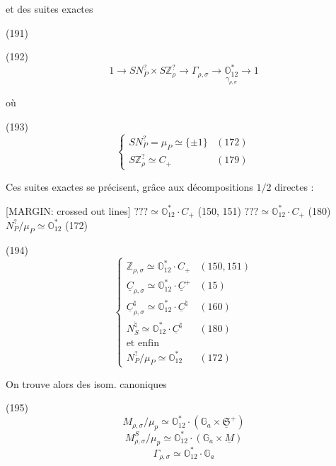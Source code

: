 et des suites exactes

(191)

(192)
$$1 \to S N^?_P \times S\mathbb{Z}^?_\rho \to \Gamma_{\rho,\sigma} \to \underset{\gamma_{\rho,\sigma}}{\mathbb{O}_{12}^*} \to 1$$

où

(193)
$$ \begin{cases} S N^?_P = \mu_P \simeq \{\pm 1\} & (172) \\ S\mathbb{Z}^?_\rho \simeq C_+ & (179) \end{cases} $$

Ces suites exactes se précisent, grâce
aux décompositions $1/2$ directes :

[MARGIN: crossed out lines]
$??? \simeq \mathbb{O}_{12}^* \cdot C_+$ (150, 151)
$??? \simeq \mathbb{O}_{12}^* \cdot C_+$ (180)
$N^?_P / \mu_P \simeq \mathbb{O}_{12}^*$ (172)

(194)
$$ \begin{cases} \mathbb{Z}_{\rho,\sigma} \simeq \mathbb{O}_{12}^* \cdot C_+ & (150, 151) \\ \underline{C}_{\rho,\sigma} \simeq \mathbb{O}_{12}^* \cdot \underline{C}^+ & (15) \\ \underline{C}^\natural_{\rho,\sigma} \simeq \mathbb{O}_{12}^* \cdot \underline{C}^\natural & (160) \\ N^\natural_S \simeq \mathbb{O}_{12}^* \cdot \underline{C}^\natural & (180) \\ \text{et enfin} \\ N^?_P / \mu_P \simeq \mathbb{O}_{12}^* & (172) \end{cases} $$

\newpage


On trouve alors des isom. canoniques

(195) 
$$M_{\rho,\sigma}/\mu_p \simeq \mathbb{O}_{12}^* \cdot ( \mathbb{G}_a \times \underline{\mathfrak{S}}^+ )$$
$$M_{\rho,\sigma}^S/\mu_p \simeq \mathbb{O}_{12}^* \cdot ( \mathbb{G}_a \times \underline{M} )$$
$$\Gamma_{\rho,\sigma} \simeq \mathbb{O}_{12}^* \cdot \mathbb{G}_a$$

